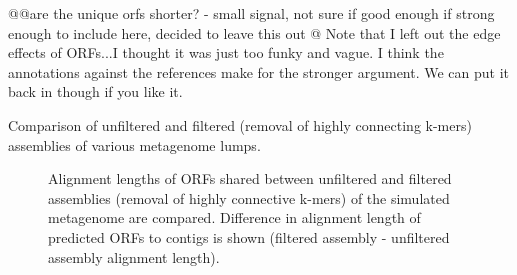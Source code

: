 \documentclass[11pt]{article} %
\begin{document}
@@are the unique orfs shorter? - small signal, not sure if good enough if strong enough to include here, decided to leave this out
@ Note that I left out the edge effects of ORFs...I thought it was just too funky and vague.  I think the annotations against the references make for the stronger argument.  We can put it back in though if you like it.

\begin{table}
\caption{Comparison of unfiltered and filtered (removal of highly connecting k-mers) assemblies of various metagenome lumps.}
\end{table}

\begin{figure}
\caption{Alignment lengths of ORFs shared between unfiltered and filtered assemblies (removal of highly connective k-mers) of the simulated metagenome are compared.  Difference in alignment length of predicted ORFs to contigs is shown (filtered assembly - unfiltered assembly alignment length).}
\end{figure}
\end{document}
